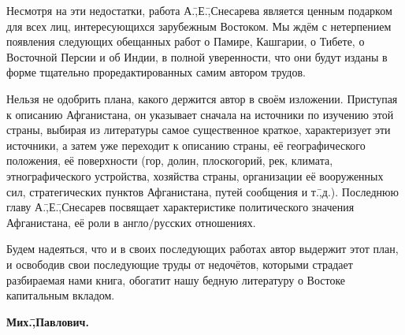 Несмотря на эти недостатки, работа А.\=,Е.\=,Снесарева является ценным подарком для всех лиц, интересующихся зарубежным Востоком. Мы ждём с нетерпением появления следующих обещанных работ о Памире, Кашгарии, о Тибете, о Восточной Персии и об Индии, в полной уверенности, что они будут изданы в форме тщательно проредактированных самим автором трудов.

Нельзя не одобрить плана, какого держится автор в своём изложении. Приступая к описанию Афганистана, он указывает сначала на источники по изучению этой страны, выбирая из литературы самое существенное краткое, характеризует эти источники, а затем уже переходит к описанию страны, её географического положения, её поверхности (гор, долин, плоскогорий, рек, климата, этнографического устройства, хозяйства страны, организации её вооруженных сил, стратегических пунктов Афганистана, путей сообщения и т.\=,д.). Последнюю главу А.\=,Е.\=,Снесарев посвящает характеристике политического значения Афганистана, её роли в англо\-/русских отношениях.

Будем надеяться, что и в своих последующих работах автор выдержит этот план, и освободив свои последующие труды от недочётов, которыми страдает разбираемая нами книга, обогатит нашу бедную литературу о Востоке капитальным вкладом.

\begin{flushright}
 \textbf{Мих.\=,Павлович.}\hspace*{2em}
\end{flushright}
